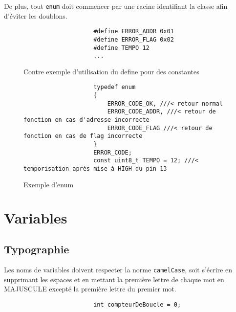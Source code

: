 			De plus, tout \verb+enum+ doit commencer par une racine identifiant la classe afin d’éviter les doublons.
			
			\begin{figure}[H]
				\begin{changemargin}{-2.5cm}{-2.5cm}
				\begin{tcolorbox}
				\begin{verbatim}
					#define ERROR_ADDR 0x01
					#define ERROR_FLAG 0x02
					#define TEMPO 12
					...
				\end{verbatim}
				\end{tcolorbox}
				\end{changemargin}
				\caption{Contre exemple d'utilisation du define pour des constantes}
				
				\begin{changemargin}{-2.5cm}{-2.5cm}
				\begin{tcolorbox}
				\begin{verbatim}
					typedef enum
					{
					    ERROR_CODE_OK, ///< retour normal
					    ERROR_CODE_ADDR, ///< retour de fonction en cas d'adresse incorrecte
					    ERROR_CODE_FLAG ///< retour de fonction en cas de flag incorrecte
					}
					ERROR_CODE;
					const uint8_t TEMPO = 12; ///< temporisation après mise à HIGH du pin 13
				\end{verbatim}
				\end{tcolorbox}
				\end{changemargin}
				\caption{Exemple d'enum}
			\end{figure}

	\section{Variables}
		\subsection{Typographie}
			Les noms de variables doivent respecter la norme \verb+camelCase+, soit s'écrire en supprimant les espaces et en mettant la première lettre de chaque mot en MAJUSCULE excepté la première lettre du premier mot.

			\begin{figure}[H]
				\begin{changemargin}{-2.5cm}{-2.5cm}
				\begin{tcolorbox}
				\begin{verbatim}
					int compteurDeBoucle = 0;
				\end{verbatim}
				\end{tcolorbox}
				\end{changemargin}
			\end{figure}

